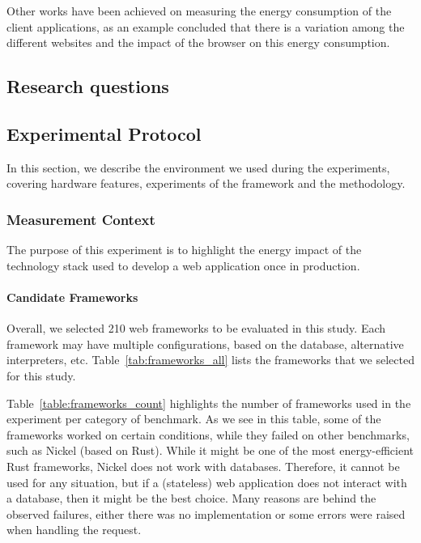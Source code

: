 Other works have been achieved on measuring the energy consumption of the client applications, as an example \cite{philippot_characterization_2014} concluded that there is a variation among the different websites and the impact of the browser on this energy consumption.

\subsection{Research questions }


\newcommand\duration{20}
\newcommand\parallelclient{512}
\subsection{Experimental Protocol}
In this section, we describe the environment we used during the experiments, covering hardware features, experiments of the framework and the methodology.

\subsubsection{Measurement Context}
The purpose of this experiment is to highlight the energy impact of the technology stack used to develop a web application once in production.

\paragraph{Candidate Frameworks}
Overall, we selected 210 web frameworks to be evaluated in this study.
Each framework may have multiple configurations, based on the database, alternative interpreters, etc.
Table~\ref{tab:frameworks_all} lists the frameworks that we selected for this study.

% 
Table~\ref{table:frameworks_count} highlights the number of frameworks used in the experiment per category of benchmark.
As we see in this table, some of the frameworks worked on certain conditions, while they failed on other benchmarks, such as Nickel (based on Rust).
While it might be one of the most energy-efficient Rust frameworks, Nickel does not work with databases.
Therefore, it cannot be used for any situation, but if a (stateless) web application does not interact with a database, then it might be the best choice.
Many reasons are behind the observed failures, either there was no implementation or some errors were raised when handling the request.

